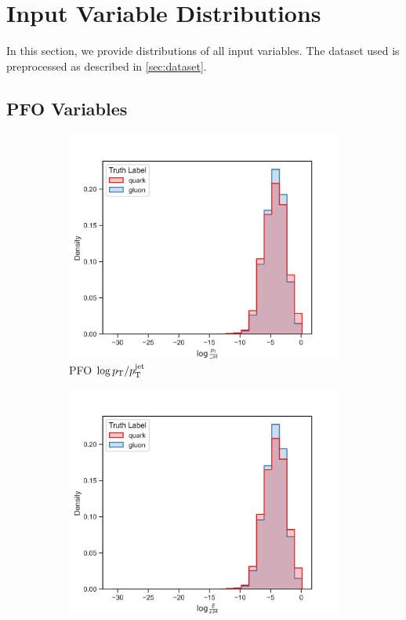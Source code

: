 \chapter{Input Variable Distributions}
\label{ch:app_input_variables}
In this section, we provide distributions of all input variables.
The dataset used is preprocessed as described in \cref{sec:dataset}.

\section{PFO Variables}
\label{sec:app_pfo_variables}
\begin{figure}[!htb]
    \begin{subfigure}[t]{0.49\textwidth}
        \includegraphics[width=\linewidth]{src/plots/distributions/PFOs/log_PT|PTjet.png}
        \caption{PFO $\log p_\text{T} / p_\text{T}^{\mathrm{jet}}$}
        \label{fig:app_pfo_log_pT_over_pT_jet}
    \end{subfigure}
    \begin{subfigure}[t]{0.49\textwidth}
        \includegraphics[width=\linewidth]{src/plots/distributions/PFOs/log_E|Ejet.png}

\end{subfigure}
\end{figure}
